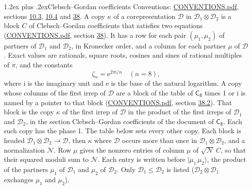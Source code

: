 \documentclass[10pt,a4paper]{article}
\makeatletter
\renewcommand\section{\@startsection{section}{1}{\z@}{-3ex plus -1ex minus -.2ex}%
  {1.2ex plus .2ex}{\normalfont\large\sffamily\bfseries\color{parttitle}}}
\numberwithin{equation}{section}
\newcommand{\grp}[1]{\mathsf{#1}}
\newcommand{\iunit}{\mathrm{i}}
\newcommand{\expe}{\mathrm{e}}
\newcommand{\rootunity}[1]{\zeta_{#1}}
\newcommand{\irrprod}{\otimes}
\newcommand{\mult}{\kappa}
\newcommand{\intx}{\mu}
\newcommand{\cgnorm}{\mathcal{N}}
\newcommand{\prodket}[2]{\lvert {#1}\,{#2}\rangle}
\makeatother
\begin{document}
\section{Clebsch--Gordan coefficients}\label{s:clebsch_gordan}
Conventions: \href{../../CONVENTIONS.pdf}{CONVENTIONS.pdf}, sections \href{../../../rotation/CONVENTIONS.pdf\#conv.10.3}{10.3}, \href{../../../rotation/CONVENTIONS.pdf\#conv.10.4}{10.4} and \href{../../CONVENTIONS.pdf\#conv.38}{38}.
\leavevmode\label{n:index.copy}\label{n:matrix.cg.stored}A copy $\mult$ of a corepresentation $\mathcal{D}$ in $\mathcal{D}_1\irrprod\mathcal{D}_2$ is a block $C$ of Clebsch--Gordan coefficients that satisfies two equations (\href{../../CONVENTIONS.pdf}{CONVENTIONS.pdf}, section \href{../../CONVENTIONS.pdf\#conv.38}{38}). \label{n:index.cg}It has a row for each pair $(\intx_1, \intx_2)$ of partners of $\mathcal{D}_1$ and $\mathcal{D}_2$, in Kronecker order, and a column for each partner $\intx$ of $\mathcal{D}$.
\leavevmode\label{n:constant.root}\label{n:index.root.order}Exact values are rationals, square roots, cosines and sines of rational multiples of $\pi$, and the constants
\begin{equation}\label{e:constants}\rootunity{n} = \expe^{2\pi\iunit/n}\quad(n = 8),\end{equation}
where $\iunit$ is the imaginary unit and $\expe$ is the base of the natural logarithm.
A copy whose columns of the first irrep of $\mathcal{D}$ are a block of the table of $\grp{C_{8}}$ times 1 or $\iunit$ is named by a pointer to that block (\href{../../CONVENTIONS.pdf}{CONVENTIONS.pdf}, section \href{../../CONVENTIONS.pdf\#conv.38.2}{38.2}). That block is the copy $\mult$ of the first irrep of $\mathcal{D}$ in the product of the first irreps of $\mathcal{D}_1$ and $\mathcal{D}_2$, in the section Clebsch--Gordan coefficients of the document of \href{../../../rotation/data/pdf/C8.pdf}{$\grp{C_{8}}$}. Each such copy has the phase 1. The table below sets every other copy.
Each block is headed $\mathcal{D}_1\irrprod\mathcal{D}_2\to\mathcal{D}$, then $\mult$ where $\mathcal{D}$ occurs more than once in $\mathcal{D}_1\irrprod\mathcal{D}_2$, and a normalization $\cgnorm$. Row $\intx$ gives the nonzero entries of column $\intx$ of $\sqrt{\cgnorm}\,C$, so that their squared moduli sum to $\cgnorm$. \label{n:vector.ket.product}Each entry is written before $\prodket{\intx_1}{\intx_2}$, the product of the partners $\intx_1$ of $\mathcal{D}_1$ and $\intx_2$ of $\mathcal{D}_2$. Only $\mathcal{D}_1 \le \mathcal{D}_2$ is listed ($\mathcal{D}_2\irrprod\mathcal{D}_1$ exchanges $\intx_1$ and $\intx_2$).
\end{document}
